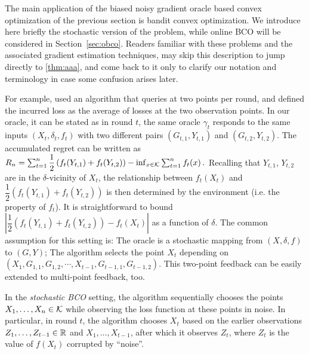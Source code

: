 The main application of the biased noisy gradient oracle based convex optimization of the previous section
is bandit convex optimization. We introduce here briefly the stochastic version of the problem, while online BCO will be considered in Section~\ref{sec:obco}. Readers familiar with these problems and the associated
gradient estimation techniques, may skip this description to jump directly to \cref{thm:aaa},
and come back to it only to clarify our notation and terminology in case some confusion arises later.

For example, \cite{AgDeXi10} used an algorithm that queries at two points per round, and defined the incurred loss as the average of losses at the two observation points. In our oracle, it can be stated as in round $t$, the same oracle $\gamma_t$ responds to the same inputs $(X_t, \delta_t, f_t)$ with two different pairs $(G_{t,1}, Y_{t,1})$ and $(G_{t,2}, Y_{t,2})$. The accumulated regret can be written as
$%
R_n = \sum_{t=1}^n \dfrac{1}{2}\left( f_t(Y_{t,1})+f_t(Y_{t,2}) \right) -\inf_{x \in \cK}\sum_{t=1}^n f_t(x) \,.
$ %
Recalling that $Y_{t,1}$, $Y_{t,2}$ are in the $\delta$-vicinity of $X_t$, the relationship between $f_t(X_t)$ and $\dfrac{1}{2}\left( f_t(Y_{t,1})+f_t(Y_{t,2})\right)$ is then determined by the environment (i.e. the property of $f_t$). It is straightforward to bound $| \dfrac{1}{2}\left( f_t(Y_{t,1})+f_t(Y_{t,2})\right)- f_t(X_t)|$ as a function of $\delta$. 
The common assumption for this setting is: The oracle is a stochastic mapping from $(X, \delta, f)$ to $(G, Y)$; The algorithm selects the point $X_t$ depending on $\left( X_1, G_{1,1}, G_{1,2}, \cdots, X_{t-1},G_{t-1,1}, G_{t-1,2}  \right)$. This two-point feedback can be easily extended to multi-point feedback, too.
\fi

In the \emph{stochastic BCO} setting,
the algorithm sequentially chooses the points $X_1,\dots,X_n\in \mathcal{K}$ while observing the loss function at these points in noise.
In particular, in round $t$, the algorithm chooses $X_t$ based on the earlier observations $Z_1,\dots,Z_{t-1}\in \mathbb{R}$ and $X_1,\dots,X_{t-1}$, after which it observes $Z_t$, where $Z_t$ is the value of $f(X_t)$ corrupted by ``noise''.


